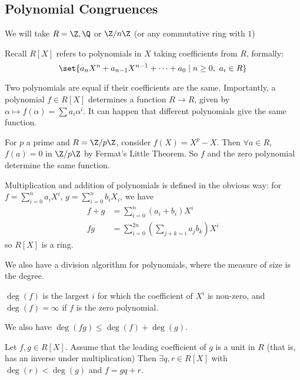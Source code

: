 \documentclass{article}
\begin{document}
\subsection{Polynomial Congruences}

We will take $R = \Z, \Q$ or $\Z/n\Z$ (or any commutative ring with $1$)

Recall $R[X]$ refers to polynomials in $X$ taking coefficients from $R$, formally:
\begin{equation*}
    \set{a_n X^n + a_{n-1} X^{n-1} + \dots + a_0 \mid n \geq 0, \ a_i \in R}
\end{equation*}

Two polynomials are equal if their coefficients are the same.
Importantly, a polynomial $f \in R[X]$ determines a function $R \to R$, given by $\alpha \mapsto f(\alpha) = \sum a_i \alpha^i$.
It can happen that different polynomials give the same function.

\begin{eg}
    For $p$ a prime and $R = \Z/p\Z$, consider $f(X) = X^p - X$.
    Then $\forall a \in R$, $f(a) = 0$ in $\Z/p\Z$ by Fermat's Little Theorem.
    So $f$ and the zero polynomial determine the same function.
\end{eg}

Multiplication and addition of polynomials is defined in the obvious way: for $f = \sum_{i=0}^n a_i X^i$, $g = \sum_{i=0}^n b_i X_i$, we have
\begin{align*}
    f + g &= \sum_{i=0}^n (a_i + b_i) X^i \\
    fg &= \sum_{i=0}^{2n} \left(\sum_{j+k=i} a_j b_k\right) X^i
\end{align*}
so $R[X]$ is a ring.

We also have a division algorithm for polynomials, where the measure of size is the degree.

\begin{defi}
    $\deg(f)$ is the largest $i$ for which the coefficient of $X^i$ is non-zero, and $\deg(f) = \infty$ if $f$ is the zero polynomial.
\end{defi}

We also have $\deg(fg) \leq \deg(f) + \deg(g)$.

\begin{defi}
    Let $f, g \in R[X]$. Assume that the leading coefficient of $g$ is a unit in $R$ (that is, has an inverse under multiplication)
    Then $\exists q, r \in R[X]$ with $\deg(r) < \deg(g)$ and $f = gq + r$.
\end{defi}
\end{document}
